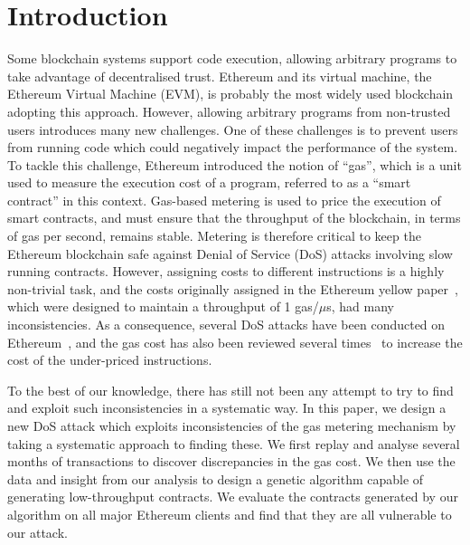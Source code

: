 \section{Introduction}
\label{sec:introduction}

Some blockchain systems support code execution, allowing arbitrary programs to take advantage of decentralised trust. Ethereum and its virtual machine, the Ethereum Virtual Machine (EVM), is probably the most widely  used blockchain adopting this approach. However, allowing arbitrary programs from non-trusted users introduces many new challenges. One of these challenges is to prevent users from running code which could negatively impact the performance of the system. To tackle this challenge, Ethereum introduced the notion of ``gas'', which is a unit used to measure the execution cost of a program, referred to as a ``smart contract'' in this context. Gas-based metering is used to price the execution of smart contracts, and must ensure that the throughput of the blockchain, in terms of gas per second, remains stable. Metering is therefore critical to keep the Ethereum blockchain safe against Denial of Service (DoS) attacks involving slow running contracts. However, assigning costs to different instructions is a highly non-trivial task, and the costs originally assigned in the Ethereum yellow paper~\cite{wood2014ethereum}, which were designed to maintain a throughput of 1 gas/$\mu$s, had many inconsistencies. As a consequence, several DoS attacks have been conducted on Ethereum~\cite{transaction-spam-attack,suicide-attack}, and the gas cost has also been reviewed several times~\cite{erc150,eip-1884} to increase the cost of the under-priced instructions.

To the best of our knowledge, there has still not been any attempt to try to find and exploit such inconsistencies in a systematic way. In this paper, we design a new DoS attack which exploits inconsistencies of the gas metering mechanism by taking a systematic approach to finding these. We first replay and analyse several months of transactions to discover discrepancies in the gas cost. We then use the data and insight from our analysis to design a genetic algorithm capable of generating low-throughput contracts. We evaluate the contracts generated by our algorithm on all major Ethereum clients and find that they are all vulnerable to our attack.

